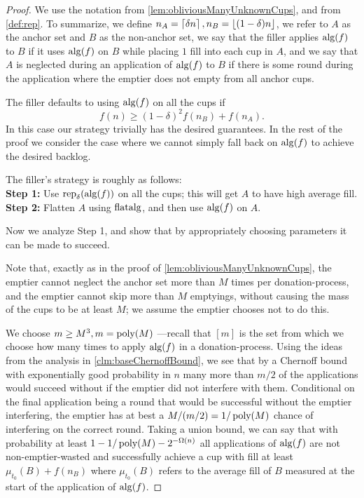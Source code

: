 \begin{proof}
  We use the notation from \cref{lem:obliviousManyUnknownCups},
  and from \cref{def:rep}. To summarize, we define $n_A =
  \left\lceil \delta n \right\rceil, n_B = \left\lfloor (1-\delta)n \right\rfloor$, we refer to $A$ as
  the anchor set and $B$ as the non-anchor set, we say that the
  filler applies $\operatorname{\text{\textup{alg}}}(f)$ to $B$ if it uses $\operatorname{\text{\textup{alg}}}(f)$ on $B$
  while placing $1$ fill into each cup in $A$, and we say that
  $A$ is neglected during an application of $\operatorname{\text{\textup{alg}}}(f)$ to $B$ if
  there is some round during the application where the emptier
  does not empty from all anchor cups.

  The filler defaults to using $\operatorname{\text{\textup{alg}}}(f)$ on all the cups if 
  $$f(n) \ge (1-\delta)^2 f(n_B) + f(n_A).$$
  In this case our strategy trivially has the desired guarantees. 
  In the rest of the proof we consider the case where we cannot
  simply fall back on $\operatorname{\text{\textup{alg}}}(f)$ to achieve the desired backlog.

  The filler's strategy is roughly as follows:\\
  \textbf{Step 1:} Use $\operatorname{\text{\textup{rep}}}_\delta(\operatorname{\text{\textup{alg}}}(f))$ on all the cups;
  this will get $A$ to have high average fill.\\
  \textbf{Step 2:} Flatten $A$ using $\operatorname{\text{\textup{flatalg}}}$, and then use
  $\operatorname{\text{\textup{alg}}}(f)$ on $A$.

  Now we analyze Step 1, and show that by appropriately choosing
  parameters it can be made to succeed.

  Note that, exactly as in the proof of
  \cref{lem:obliviousManyUnknownCups}, the emptier cannot neglect
  the anchor set more than $M$ times per donation-process, and
  the emptier cannot skip more than $M$ emptyings, without
  causing the mass of the cups to be at least $M$; we assume the
  emptier chooses not to do this.

  We choose $m\ge M^3, m = \operatorname{\text{poly}}(M)$ ---recall that $[m]$ is
  the set from which we choose how many times to apply $\operatorname{\text{\textup{alg}}}(f)$
  in a donation-process. Using the ideas from the analysis in
  \cref{clm:baseChernoffBound}, we see that by a Chernoff bound
  with exponentially good probability in $n$ many more than $m/2$
  of the applications would succeed without if the emptier did
  not interfere with them. Conditional on the final application
  being a round that would be successful without the emptier
  interfering, the emptier has at best a $M/(m/2)= 1/\operatorname{\text{poly}}(M)$
  chance of interfering on the correct round.
  Taking a union bound, we can say that with probability at least
  $1-1/\operatorname{\text{poly}}(M) - 2^{-\Omega(n)}$ all applications of $\operatorname{\text{\textup{alg}}}(f)$
  are not non-emptier-wasted and successfully achieve a cup with
  fill at least $\mu_{t_0}(B) + f(n_B)$ where $\mu_{t_0}(B)$ refers to the
  average fill of $B$ measured at the start of the application of
  $\operatorname{\text{\textup{alg}}}(f)$.


\end{proof}
